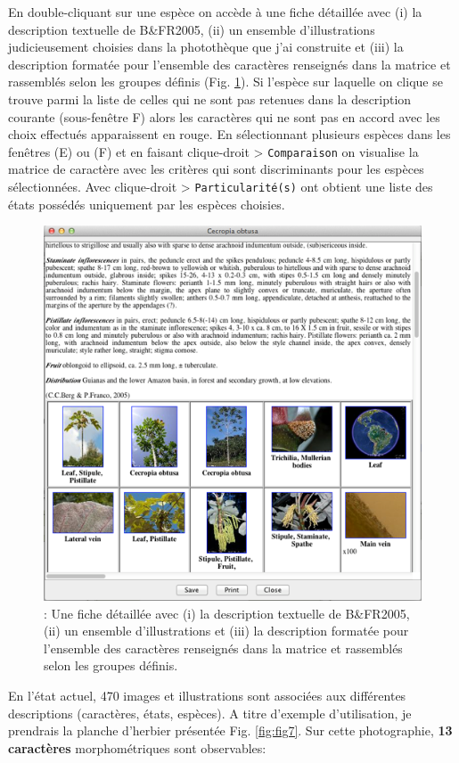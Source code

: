 \documentclass[a4paper]{article}
\theoremstyle{definition}
\theoremstyle{definition}
\theoremstyle{definition}
\theoremstyle{remark}
\begin{document}
En double-cliquant sur une espèce on accède à une fiche détaillée avec
(i) la description textuelle de B\&FR2005, (ii) un ensemble
d'illustrations judicieusement choisies dans la photothèque que j'ai
construite et (iii) la description formatée pour l'ensemble des
caractères renseignés dans la matrice et rassemblés selon les groupes
définis (Fig. \ref{fig:fig6}). Si l'espèce sur laquelle on clique se
trouve parmi la liste de celles qui ne sont pas retenues dans la
description courante (sous-fenêtre F) alors les caractères qui ne sont
pas en accord avec les choix effectués apparaissent en rouge. En
sélectionnant plusieurs espèces dans les fenêtres (E) ou (F) et en
faisant clique-droit \textgreater{} \texttt{Comparaison} on visualise la
matrice de caractère avec les critères qui sont discriminants pour les
espèces sélectionnées. Avec clique-droit \textgreater{}
\texttt{Particularité(s)} ont obtient une liste des états possédés
uniquement par les espèces choisies.






\begin{figure}[H]

{\centering \includegraphics[width=0.7\linewidth]{figure/fig6} 

}

\caption{: Une fiche détaillée avec (i) la description textuelle de
B\&FR2005, (ii) un ensemble d'illustrations et (iii) la description
formatée pour l'ensemble des caractères renseignés dans la matrice et
rassemblés selon les groupes définis.}\label{fig:fig6}
\end{figure}

En l'état actuel, 470 images et illustrations sont associées aux
différentes descriptions (caractères, états, espèces). A titre d'exemple
d'utilisation, je prendrais la planche d'herbier présentée Fig.
\ref{fig:fig7}. Sur cette photographie, \textbf{13 caractères}
morphométriques sont observables:
\end{document}
